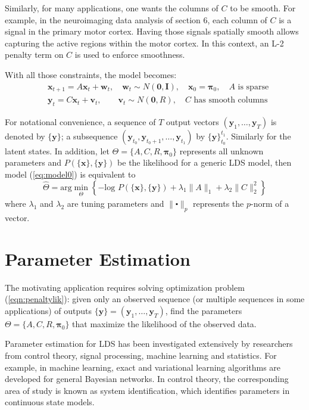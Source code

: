\documentclass[fleqn]{article}
\let\oldref\ref
\renewcommand{\ref}[1]{(\oldref{#1})}
\begin{document}
Similarly, for many applications, one wants the columns of $C$ to be smooth. For example, in the neuroimaging data analysis of section 6, each column of $C$ is a signal in the primary motor cortex. Having those signals spatially smooth allows capturing the active regions within the motor cortex. In this context, an L-2 penalty term on $C$ is used to enforce smoothness.

With all those constraints, the model becomes:
\begin{equation}\label{eq:model0}
\begin{aligned}
	&\mathbf{x}_{t+1}=A\mathbf{x}_{t}+\mathbf{w}_t, \quad \mathbf{w}_t\sim N(\mathbf{0},\mathbf{I}),\quad \mathbf{x}_0 = \mathbf{\pi}_0,\quad A \text{ is sparse}\\
	&\mathbf{y}_t=C\mathbf{x}_t+\mathbf{v}_t,\qquad \mathbf{v}_t\sim N(\mathbf{0},R),\quad C \text{ has smooth columns}
\end{aligned}
\end{equation}

For notational convenience, a sequence of $T$ output vectors $(\mathbf{y}_1,\ldots,\mathbf{y}_T)$ is denoted by $\{\mathbf{y}\}$; a subsequence $(\mathbf{y}_{t_0},\mathbf{y}_{t_0 + 1},\ldots,\mathbf{y}_{t_1})$ by $\{\mathbf{y}\}_{t_0}^{t_1}$. Similarly for the latent states. In addition, let $\Theta =\{A,C,R,\mathbf{\pi}_0\}$ represents all unknown parameters and $P(\{\mathbf{x}\},\{\mathbf{y}\})$ be the likelihood for a generic LDS model, then model \ref{eq:model0} is equivalent to
\begin{equation}\label{eqn:penaltylik}
\hat{\Theta}=\text{arg}\min_{\substack{\Theta}}\left\{-\text{log }P(\{\textbf{x}\},\{\textbf{y}\})+\lambda_1\|A\|_1+\lambda_2\|C\|_2^2\right\}
\end{equation}
where $\lambda_1$ and $\lambda_2$ are tuning parameters and $\|\centerdot\|_p$ represents the $p$-norm of a vector.

\section{Parameter Estimation}
The motivating application requires solving optimization problem \ref{eqn:penaltylik}: given only an observed sequence (or multiple sequences in some applications) of outputs $\{\mathbf{y}\}=(\mathbf{y}_1,\ldots,\mathbf{y}_T)$, find the parameters $\Theta=\{A,C,R,\mathbf{\pi}_0\}$ that maximize the likelihood of the observed data.

Parameter estimation for LDS has been investigated extensively by researchers from control theory, signal processing, machine learning and statistics. For example, in machine learning, exact and variational learning algorithms are developed for general Bayesian networks. In control theory, the corresponding area of study is known as system identification, which identifies parameters in continuous state models.
\end{document}
